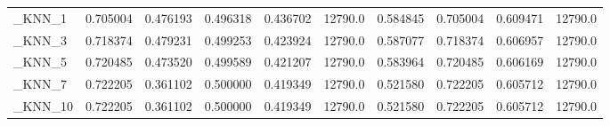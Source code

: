 \begin{tabular}{lrrrrrrrrr}
\_KNN\_1                                             &  0.705004 &         0.476193 &      0.496318 &        0.436702 &        12790.0 &            0.584845 &         0.705004 &           0.609471 &           12790.0 \\
\_KNN\_3                                             &  0.718374 &         0.479231 &      0.499253 &        0.423924 &        12790.0 &            0.587077 &         0.718374 &           0.606957 &           12790.0 \\
\_KNN\_5                                             &  0.720485 &         0.473520 &      0.499589 &        0.421207 &        12790.0 &            0.583964 &         0.720485 &           0.606169 &           12790.0 \\
\_KNN\_7                                             &  0.722205 &         0.361102 &      0.500000 &        0.419349 &        12790.0 &            0.521580 &         0.722205 &           0.605712 &           12790.0 \\
\_KNN\_10                                            &  0.722205 &         0.361102 &      0.500000 &        0.419349 &        12790.0 &            0.521580 &         0.722205 &           0.605712 &           12790.0 \\
\bottomrule
\end{tabular}
